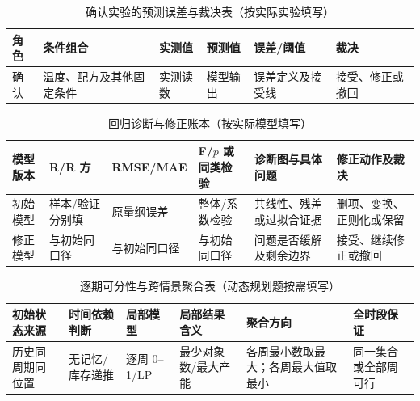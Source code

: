 \documentclass[withoutpreface,bwprint]{cumcmthesis}
\newif\ifmcmguidance
\begin{document}
\ifmcmguidance
  \begin{quote}\small
  \textbf{从网上模板迁移的边界：}旧 Word 模板中的 RMSE=3.26、MAPE=4.12\% 等数值只是排版示例，不能复制为本题结果；“误差小于 5\%”“普适性极强”等句子也只能在当前数据和检验实际支持时使用。每个检验先写对象、数据来源、误差定义和接受标准，再写通过或未通过及其对结论的影响。
  \end{quote}
\fi

\ifmcmguidance
  \begin{table}[H]
    \centering
    \small
    \caption{确认实验的预测误差与裁决表（按实际实验填写）}
    \label{tab:prediction-confirmation-guide}
    \begin{tabular}{p{1.4cm}p{3.2cm}p{2.0cm}p{2.0cm}p{2.4cm}p{2.4cm}}
      \toprule
      角色 & 条件组合 & 实测值 & 预测值 & 误差/阈值 & 裁决 \\
      \midrule
      确认 & 温度、配方及其他固定条件 & 实测读数 & 模型输出 & 误差定义及接受线 & 接受、修正或撤回 \\
      \bottomrule
    \end{tabular}
  \end{table}
  \begin{table}[H]
    \centering
    \small
    \caption{回归诊断与修正账本（按实际模型填写）}
    \label{tab:regression-diagnostics-guide}
    \begin{tabular}{p{1.7cm}p{1.9cm}p{1.9cm}p{1.9cm}p{2.6cm}p{2.7cm}}
      \toprule
      模型版本 & R/R 方 & RMSE/MAE & F/$p$ 或同类检验 & 诊断图与具体问题 & 修正动作及裁决 \\
      \midrule
      初始模型 & 样本/验证分别填 & 原量纲误差 & 整体/系数检验 & 共线性、残差或过拟合证据 & 删项、变换、正则化或保留 \\
      修正模型 & 与初始同口径 & 与初始同口径 & 与初始同口径 & 问题是否缓解及剩余边界 & 接受、继续修正或撤回 \\
      \bottomrule
    \end{tabular}
  \end{table}
  \begin{table}[H]
    \centering
    \small
    \caption{逐期可分性与跨情景聚合表（动态规划题按需填写）}
    \label{tab:temporal-decomposition-aggregation-guide}
    \begin{tabular}{p{2.0cm}p{1.8cm}p{1.7cm}p{2.1cm}p{2.0cm}p{2.1cm}}
      \toprule
      初始状态来源 & 时间依赖判断 & 局部模型 & 局部结果含义 & 聚合方向 & 全时段保证 \\
      \midrule
      历史同周期同位置 & 无记忆/库存递推 & 逐周 0--1/LP & 最少对象数/最大产能 & 各周最小数取最大；各周最大值取最小 & 同一集合或全部周可行 \\
      \bottomrule
    \end{tabular}
  \end{table}
\end{document}
